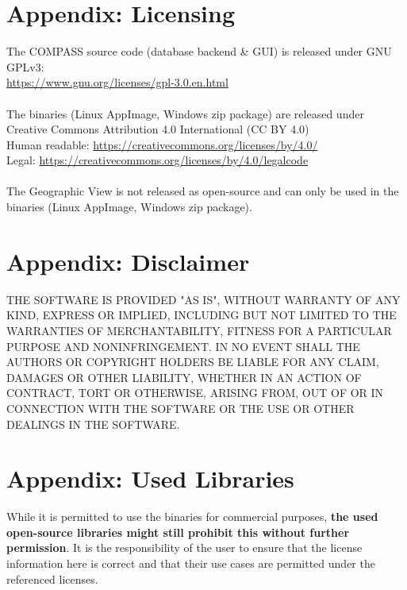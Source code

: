 \section{Appendix: Licensing}
\label{sec:appendix_licensing}

The COMPASS source code (database backend \& GUI) is released under GNU GPLv3: \\
\url{https://www.gnu.org/licenses/gpl-3.0.en.html} \\\\

The binaries (Linux AppImage, Windows zip package) are released under Creative Commons Attribution 4.0 International (CC BY 4.0) \\
Human readable: \url{https://creativecommons.org/licenses/by/4.0/} \\
Legal: \url{https://creativecommons.org/licenses/by/4.0/legalcode} \\\\

The Geographic View is not released as open-source and can only be used in the binaries (Linux AppImage, Windows zip package).

\section{Appendix: Disclaimer}

THE SOFTWARE IS PROVIDED "AS IS", WITHOUT WARRANTY OF ANY KIND, EXPRESS OR IMPLIED, INCLUDING BUT NOT LIMITED TO THE WARRANTIES OF MERCHANTABILITY, FITNESS FOR A PARTICULAR PURPOSE AND NONINFRINGEMENT. IN NO EVENT SHALL THE AUTHORS OR COPYRIGHT HOLDERS BE LIABLE FOR ANY CLAIM, DAMAGES OR OTHER LIABILITY, WHETHER IN AN ACTION OF CONTRACT, TORT OR OTHERWISE, ARISING FROM, OUT OF OR IN CONNECTION WITH THE SOFTWARE OR THE USE OR OTHER DEALINGS IN THE SOFTWARE.

\section{Appendix: Used Libraries}

While it is permitted to use the binaries for commercial purposes, \textbf{the used open-source libraries might still prohibit this without further permission}. It is the responsibility of the user to ensure that the license information here is correct and that their use cases are permitted under the referenced licenses.

